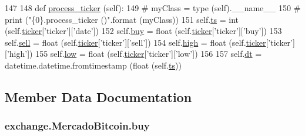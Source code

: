 \begin{DoxyCode}
147 
148     \textcolor{keyword}{def }\hyperlink{classexchange_1_1_mercado_bitcoin_a1ca10d96c4b4a39236c8312857046994}{process\_ticker} (self):
149 \textcolor{comment}{#        myClass = type (self).\_\_name\_\_}
150 \textcolor{comment}{#        print ("\{0\}.process\_ticker ()".format (myClass))}
151         self.\hyperlink{classexchange_1_1_mercado_bitcoin_ac4630b08e08f9eeb9dad838dc9dc0cda}{ts}   = int   (self.\hyperlink{classexchange_1_1_exchange_a7cf9e52f993627955a2e242c388daaeb}{ticker}[\textcolor{stringliteral}{'ticker'}][\textcolor{stringliteral}{'date'}])
152         self.\hyperlink{classexchange_1_1_mercado_bitcoin_ada27b62a35286b9f5dbb54590c5bacd2}{buy}  = float (self.\hyperlink{classexchange_1_1_exchange_a7cf9e52f993627955a2e242c388daaeb}{ticker}[\textcolor{stringliteral}{'ticker'}][\textcolor{stringliteral}{'buy'}])
153         self.\hyperlink{classexchange_1_1_mercado_bitcoin_a9982c7a3f6103c88c64160a5854c35cd}{sell} = float (self.\hyperlink{classexchange_1_1_exchange_a7cf9e52f993627955a2e242c388daaeb}{ticker}[\textcolor{stringliteral}{'ticker'}][\textcolor{stringliteral}{'sell'}])
154         self.\hyperlink{classexchange_1_1_mercado_bitcoin_a0b9c2d465601a48e3b8838354e931c39}{high} = float (self.\hyperlink{classexchange_1_1_exchange_a7cf9e52f993627955a2e242c388daaeb}{ticker}[\textcolor{stringliteral}{'ticker'}][\textcolor{stringliteral}{'high'}])
155         self.\hyperlink{classexchange_1_1_mercado_bitcoin_aaa3aae824bfc5ba3b7dc5252e9554713}{low}  = float (self.\hyperlink{classexchange_1_1_exchange_a7cf9e52f993627955a2e242c388daaeb}{ticker}[\textcolor{stringliteral}{'ticker'}][\textcolor{stringliteral}{'low'}])
156     
157         self.\hyperlink{classexchange_1_1_mercado_bitcoin_aeee983ba4f72223a11fb914d22902c56}{dt} = datetime.datetime.fromtimestamp (float (self.\hyperlink{classexchange_1_1_mercado_bitcoin_ac4630b08e08f9eeb9dad838dc9dc0cda}{ts}))
    
\end{DoxyCode}


\subsection{Member Data Documentation}
\hypertarget{classexchange_1_1_mercado_bitcoin_ada27b62a35286b9f5dbb54590c5bacd2}{
\subsubsection[{buy}]{\setlength{\rightskip}{0pt plus 5cm}exchange.\-Mercado\-Bitcoin.\-buy}}\label{classexchange_1_1_mercado_bitcoin_ada27b62a35286b9f5dbb54590c5bacd2}


